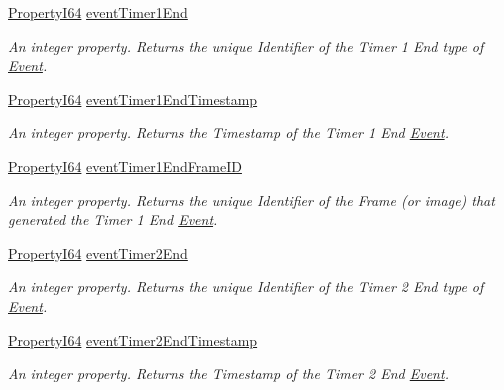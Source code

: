 \begin{DoxyCompactItemize}
\hyperlink{group___common_interface_ga81749b2696755513663492664a18a893}{Property\+I64} \hyperlink{classmv_i_m_p_a_c_t_1_1acquire_1_1_gen_i_cam_1_1_event_control_a4090f8e44f9f5be8b127c92cbeedf57d}{event\+Timer1\+End}
\begin{DoxyCompactList}\small\item\em An integer property. Returns the unique Identifier of the Timer 1 End type of \hyperlink{classmv_i_m_p_a_c_t_1_1acquire_1_1_event}{Event}. \end{DoxyCompactList}\item 
\hyperlink{group___common_interface_ga81749b2696755513663492664a18a893}{Property\+I64} \hyperlink{classmv_i_m_p_a_c_t_1_1acquire_1_1_gen_i_cam_1_1_event_control_a20186a35955fc0bba415c806a182a9bb}{event\+Timer1\+End\+Timestamp}
\begin{DoxyCompactList}\small\item\em An integer property. Returns the Timestamp of the Timer 1 End \hyperlink{classmv_i_m_p_a_c_t_1_1acquire_1_1_event}{Event}. \end{DoxyCompactList}\item 
\hyperlink{group___common_interface_ga81749b2696755513663492664a18a893}{Property\+I64} \hyperlink{classmv_i_m_p_a_c_t_1_1acquire_1_1_gen_i_cam_1_1_event_control_aa2a14fbba221a83de15b4aa3cb259e81}{event\+Timer1\+End\+Frame\+I\+D}
\begin{DoxyCompactList}\small\item\em An integer property. Returns the unique Identifier of the Frame (or image) that generated the Timer 1 End \hyperlink{classmv_i_m_p_a_c_t_1_1acquire_1_1_event}{Event}. \end{DoxyCompactList}\item 
\hyperlink{group___common_interface_ga81749b2696755513663492664a18a893}{Property\+I64} \hyperlink{classmv_i_m_p_a_c_t_1_1acquire_1_1_gen_i_cam_1_1_event_control_abdfd944bae55c90b5fda22fc40b0ecbf}{event\+Timer2\+End}
\begin{DoxyCompactList}\small\item\em An integer property. Returns the unique Identifier of the Timer 2 End type of \hyperlink{classmv_i_m_p_a_c_t_1_1acquire_1_1_event}{Event}. \end{DoxyCompactList}\item 
\hyperlink{group___common_interface_ga81749b2696755513663492664a18a893}{Property\+I64} \hyperlink{classmv_i_m_p_a_c_t_1_1acquire_1_1_gen_i_cam_1_1_event_control_a89fbc4d6aa6bc92f19a5d43a4c2335f1}{event\+Timer2\+End\+Timestamp}
\begin{DoxyCompactList}\small\item\em An integer property. Returns the Timestamp of the Timer 2 End \hyperlink{classmv_i_m_p_a_c_t_1_1acquire_1_1_event}{Event}. \end{DoxyCompactList}\item 

\end{DoxyCompactItemize}
